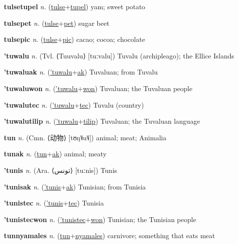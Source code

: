 \textbf{\hypertarget{tulsetupel}{tulsetupel}} \textit{n.} (\hyperlink{tulse}{tulse}+\allowbreak \hyperlink{tupel}{tupel})
yam; sweet potato

\textbf{\hypertarget{tulsepet}{tulsepet}} \textit{n.} (\hyperlink{tulse}{tulse}+\allowbreak \hyperlink{pet}{pet})
sugar beet

\textbf{\hypertarget{tulsepic}{tulsepic}} \textit{n.} (\hyperlink{tulse}{tulse}+\allowbreak \hyperlink{pic}{pic})
cacao; cocoa; chocolate

\textbf{\hypertarget{'tuwalu}{'tuwalu}} \textit{n.} (Tvl. ⟨Tuuvalu⟩ [tuːvalu])
Tuvalu (archipleago); the Ellice Islands

\textbf{\hypertarget{'tuwaluak}{'tuwaluak}} \textit{n.} (\hyperlink{'tuwalu}{'tuwalu}+\allowbreak \hyperlink{ak}{ak})
Tuvaluan; from Tuvalu

\textbf{\hypertarget{'tuwaluwon}{'tuwaluwon}} \textit{n.} (\hyperlink{'tuwalu}{'tuwalu}+\allowbreak \hyperlink{won}{won})
Tuvaluan; the Tuvaluan people

\textbf{\hypertarget{'tuwalutec}{'tuwalutec}} \textit{n.} (\hyperlink{'tuwalu}{'tuwalu}+\allowbreak \hyperlink{tec}{tec})
Tuvalu (country)

\textbf{\hypertarget{'tuwalutilip}{'tuwalutilip}} \textit{n.} (\hyperlink{'tuwalu}{'tuwalu}+\allowbreak \hyperlink{tilip}{tilip})
Tuvaluan; the Tuvaluan language

\textbf{\hypertarget{tun}{tun}} \textit{n.} (Cmn. ⟨{\chinese{}动物}⟩ [tʊŋ˥˩u˥˩])
animal; meat; Animalia

\textbf{\hypertarget{tunak}{tunak}} \textit{n.} (\hyperlink{tun}{tun}+\allowbreak \hyperlink{ak}{ak})
animal; meaty

\textbf{\hypertarget{'tunis}{'tunis}} \textit{n.} (Ara. ⟨{\arabics{}تونس}⟩ [tuːnis])
Tunis

\textbf{\hypertarget{'tunisak}{'tunisak}} \textit{n.} (\hyperlink{'tunis}{'tunis}+\allowbreak \hyperlink{ak}{ak})
Tunisian; from Tunisia

\textbf{\hypertarget{'tunistec}{'tunistec}} \textit{n.} (\hyperlink{'tunis}{'tunis}+\allowbreak \hyperlink{tec}{tec})
Tunisia

\textbf{\hypertarget{'tunistecwon}{'tunistecwon}} \textit{n.} (\hyperlink{'tunistec}{'tunistec}+\allowbreak \hyperlink{won}{won})
Tunisian; the Tunisian people

\textbf{\hypertarget{tunnyamales}{tunnyamales}} \textit{n.} (\hyperlink{tun}{tun}+\allowbreak \hyperlink{nyamales}{nyamales})
carnivore; something that eats meat

